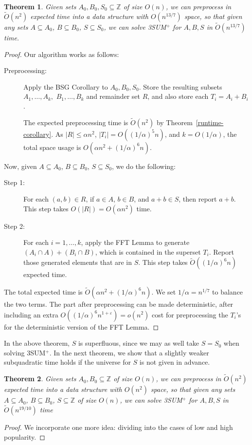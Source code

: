 \documentclass[11pt]{article}
\newtheorem{theorem}{Theorem}[section]
\newcommand{\eps}{\varepsilon}
\newcommand{\Z}{\mathbb{Z}}
\newcommand{\OO}{\widetilde{O}}
\begin{document}
{\begin{theorem}\label{thm-preproc1}
Given sets $A_0,B_0,S_0\subseteq\Z$ of size $O(n)$, we can
preprocess in $\OO(n^2)$ expected time into a data structure
with $O(n^{13/7})$ space, so that given any sets $A\subseteq A_0$,
$B\subseteq B_0$, $S\subseteq S_0$, we can solve 3SUM$^+$
for $A,B,S$ in $\OO(n^{13/7})$ time.
\end{theorem}
\begin{proof}
Our algorithm works as follows:
\begin{description}
\item[Preprocessing:] Apply the BSG
Corollary to $A_0,B_0,S_0$.  Store the resulting subsets $A_1,\ldots,A_k,$ $B_1,\ldots,B_k$ and remainder set $R$, and
also store each $T_i=A_i+B_i$.

The expected preprocessing time is $\OO(n^2)$ by Theorem~\ref{runtime-corollary}.
As $|R|\le \alpha n^2$, $|T_i|=O((1/\alpha)^5 n)$, and $k=O(1/\alpha)$,
the total space usage is $O(\alpha n^2 + (1/\alpha)^6 n)$.
\end{description}

Now, given $A\subseteq A_0$, $B\subseteq B_0$, $S\subseteq S_0$,
we do the following:
\begin{description}
\item[Step 1:] For each $(a,b)\in R$, if $a\in A$, $b\in B$, and
$a+b\in S$, then report $a+b$.
This step takes $O(|R|)=O(\alpha n^2)$ time.

\item[Step 2:] For each $i=1,\ldots,k$, apply the FFT Lemma to generate
$(A_i\cap A) + (B_i\cap B)$, which is contained in the superset $T_i$.  Report those generated elements that are in $S$.
This step takes $\OO((1/\alpha)^6 n)$ expected time.
\end{description}

The total expected time
is $\OO(\alpha n^2 + (1/\alpha)^6 n)$.  We set $1/\alpha = n^{1/7}$
to balance the two terms.
The part after preprocessing can be made deterministic,
after including
an extra $O((1/\alpha)^6 n^{1+\eps})=o(n^2)$ cost for preprocessing
the $T_i$'s for the deterministic version of the FFT Lemma.
\end{proof}

In the above theorem, $S$ is superfluous, since
we may as well take $S=S_0$ when solving 3SUM$^+$.  In the
next theorem, we show that a slightly weaker
subquadratic time holds if the universe for $S$ is not given in advance.

\begin{theorem}\label{thm-preproc2}
Given sets $A_0,B_0\subseteq\Z$ of size $O(n)$, we can
preprocess in $\OO(n^2)$ expected time into a data structure
with $O(n^2)$ space, so that given any sets $A\subseteq A_0$,
$B\subseteq B_0$, $S\subseteq \Z$ of size $O(n)$, we can solve 3SUM$^+$
for $A,B,S$ in $\OO(n^{19/10})$ time
\end{theorem}
\begin{proof}
We incorporate one more idea: dividing into the cases of
low and high popularity.


\end{proof}}
\end{document}
